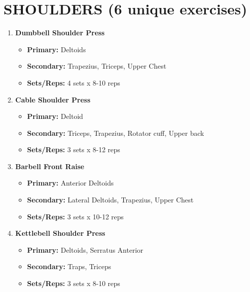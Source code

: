 \documentclass{article}
\begin{document}
\section*{SHOULDERS (6 unique exercises)}
\begin{enumerate}[label=\arabic*., wide=0pt, leftmargin=*]
    \item \textbf{Dumbbell Shoulder Press}
        \begin{itemize}[label=\textbullet, leftmargin=*, nosep, topsep=0pt, partopsep=0pt]
            \item \textbf{Primary:} Deltoids
            \item \textbf{Secondary:} Trapezius, Triceps, Upper Chest
            \item \textbf{Sets/Reps:} 4 sets x 8-10 reps
        \end{itemize}

    \item \textbf{Cable Shoulder Press}
        \begin{itemize}[label=\textbullet, leftmargin=*, nosep, topsep=0pt, partopsep=0pt]
            \item \textbf{Primary:} Deltoid
            \item \textbf{Secondary:} Triceps, Trapezius, Rotator cuff, Upper back
            \item \textbf{Sets/Reps:} 3 sets x 8-12 reps
        \end{itemize}

    \item \textbf{Barbell Front Raise}
        \begin{itemize}[label=\textbullet, leftmargin=*, nosep, topsep=0pt, partopsep=0pt]
            \item \textbf{Primary:} Anterior Deltoids
            \item \textbf{Secondary:} Lateral Deltoids, Trapezius, Upper Chest
            \item \textbf{Sets/Reps:} 3 sets x 10-12 reps
        \end{itemize}

    \item \textbf{Kettlebell Shoulder Press}
        \begin{itemize}[label=\textbullet, leftmargin=*, nosep, topsep=0pt, partopsep=0pt]
            \item \textbf{Primary:} Deltoids, Serratus Anterior
            \item \textbf{Secondary:} Traps, Triceps
            \item \textbf{Sets/Reps:} 3 sets x 8-10 reps
        \end{itemize}


\end{enumerate}
\end{document}
